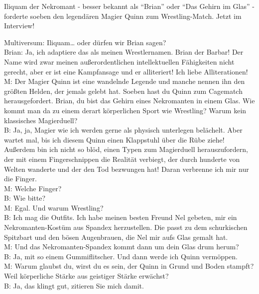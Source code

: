 \documentclass[final]{multiversum}
\begin{document}
Iliquam der Nekromant - besser bekannt als \enquote{Brian} oder \enquote{Das Gehirn im Glas} - forderte soeben den legendären Magier Quinn zum Wrestling-Match. Jetzt im Interview! 

Multiversum: Iliquam… oder dürfen wir Brian sagen?\\
Brian: Ja, ich adaptiere das als meinen Wrestlernamen. 
Brian der Barbar! 
Der Name wird zwar meinen außerordentlichen intellektuellen Fähigkeiten nicht gerecht, aber er ist eine Kampfansage und er alliteriert! 
Ich liebe Alliterationen! \\
M: Der Magier Quinn ist eine wandelnde Legende und manche nennen ihn den größten Helden, der jemals gelebt hat.
 Soeben hast du Quinn zum Cagematch herausgefordert. 
 Brian, du bist das Gehirn eines Nekromanten in einem Glas. 
 Wie kommt man da zu einem derart körperlichen Sport wie Wrestling?  
 Warum kein klassisches Magierduell?\\
B: Ja, ja, Magier wie ich werden gerne als physisch unterlegen belächelt. 
Aber wartet mal, bis ich diesem Quinn einen Klappstuhl über die Rübe ziehe! 
Außerdem bin ich nicht so blöd, einen Typen zum Magierduell herauszufordern, der mit einem Fingerschnippen die Realität verbiegt, der durch hunderte von Welten wanderte und der den Tod bezwungen hat! 
Daran verbrenne ich mir nur die Finger.\\
M: Welche Finger?\\
B: Wie bitte?\\
M: Egal. Und warum Wrestling?\\
B: Ich mag die Outfits. 
Ich habe meinen besten Freund Nel gebeten, mir ein Nekromanten-Kostüm aus Spandex herzustellen. 
Die passt zu dem schurkischen Spitzbart und den bösen Augenbrauen, die Nel mir aufs Glas gemalt hat.\\
M: Und das Nekromanten-Spandex kommt dann um dein Glas drum herum?\\
B: Ja, mit so einem Gummiflitscher. Und dann werde ich Quinn vermöppen. \\
M: Warum glaubst du, wirst du es sein, der Quinn in Grund und Boden stampft? 
Weil körperliche Stärke aus geistiger Stärke erwächst?\\
B: Ja, das klingt gut, zitieren Sie mich damit.
\end{document}
